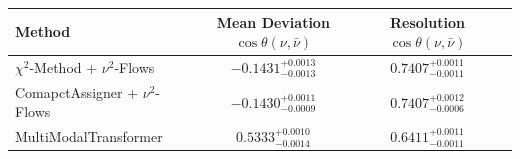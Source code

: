     \begin{tabular}{lccc}
        \toprule
        Method & Mean Deviation $\cos\theta(\nu, \bar{\nu})$ & Resolution $\cos\theta(\nu, \bar{\nu})$ \\
        \midrule
        $\chi^2$-Method + $\nu^2$-Flows & $-0.1431^{+0.0013}_{-0.0013}$ & $0.7407^{+0.0011}_{-0.0011}$ \\
        ComapctAssigner + $\nu^2$-Flows & $-0.1430^{+0.0011}_{-0.0009}$ & $0.7407^{+0.0012}_{-0.0006}$ \\
        MultiModalTransformer & $0.5333^{+0.0010}_{-0.0014}$ & $0.6411^{+0.0011}_{-0.0011}$ \\
        \bottomrule
    \end{tabular}